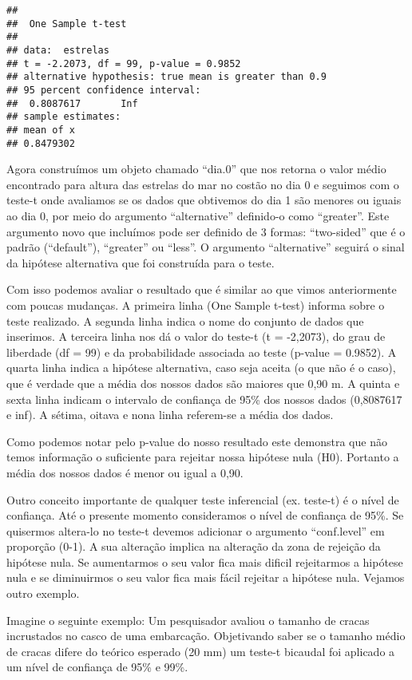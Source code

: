 \documentclass[titlepage, oneside, openany, a4paper]{book}
\begin{document}
\begin{verbatim}
## 
##  One Sample t-test
## 
## data:  estrelas
## t = -2.2073, df = 99, p-value = 0.9852
## alternative hypothesis: true mean is greater than 0.9
## 95 percent confidence interval:
##  0.8087617       Inf
## sample estimates:
## mean of x 
## 0.8479302
\end{verbatim}

Agora construímos um objeto chamado ``dia.0'' que nos retorna o valor médio encontrado para altura das estrelas do mar no costão no dia 0 e seguimos com o teste-t onde avaliamos se os dados que obtivemos do dia 1 são menores ou iguais ao dia 0, por meio do argumento ``alternative'' definido-o como ``greater''. Este argumento novo que incluímos pode ser definido de 3 formas: ``two-sided'' que é o padrão (``default''), ``greater'' ou ``less''. O argumento ``alternative'' seguirá o sinal da hipótese alternativa que foi construída para o teste.

Com isso podemos avaliar o resultado que é similar ao que vimos anteriormente com poucas mudanças. A primeira linha (One Sample t-test) informa sobre o teste realizado. A segunda linha indica o nome do conjunto de dados que inserimos. A terceira linha nos dá o valor do teste-t (t = -2,2073), do grau de liberdade (df = 99) e da probabilidade associada ao teste (p-value = 0.9852). A quarta linha indica a hipótese alternativa, caso seja aceita (o que não é o caso), que é verdade que a média dos nossos dados são maiores que 0,90 m. A quinta e sexta linha indicam o intervalo de confiança de 95\% dos nossos dados (0,8087617 e inf). A sétima, oitava e nona linha referem-se a média dos dados.

Como podemos notar pelo p-value do nosso resultado este demonstra que não temos informação o suficiente para rejeitar nossa hipótese nula (H0). Portanto a média dos nossos dados é menor ou igual a 0,90.

Outro conceito importante de qualquer teste inferencial (ex. teste-t) é o nível de confiança. Até o presente momento consideramos o nível de confiança de 95\%. Se quisermos altera-lo no teste-t devemos adicionar o argumento ``conf.level'' em proporção (0-1). A sua alteração implica na alteração da zona de rejeição da hipótese nula. Se aumentarmos o seu valor fica mais dificil rejeitarmos a hipótese nula e se diminuirmos o seu valor fica mais fácil rejeitar a hipótese nula. Vejamos outro exemplo.

Imagine o seguinte exemplo: Um pesquisador avaliou o tamanho de cracas incrustados no casco de uma embarcação. Objetivando saber se o tamanho médio de cracas difere do teórico esperado (20 mm) um teste-t bicaudal foi aplicado a um nível de confiança de 95\% e 99\%.
\end{document}
